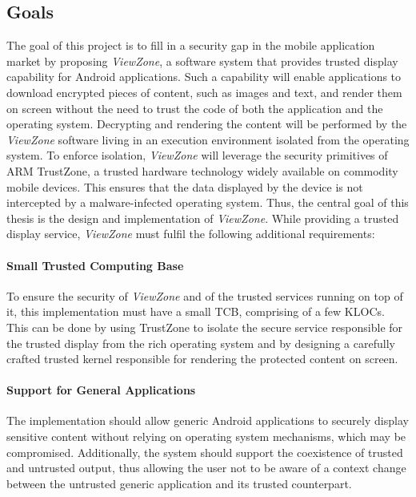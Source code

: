\subsection{Goals}
The goal of this project is to fill in a security gap in the mobile application market by proposing \emph{ViewZone}, a software system that provides trusted display capability for Android applications. Such a capability will enable applications to download encrypted pieces of content, such as images and text, and render them on screen without the need to trust the code of both the application and the operating system. Decrypting and rendering the content will be performed by the \emph{ViewZone} software living in an execution environment isolated from the operating system. To enforce isolation, \emph{ViewZone} will leverage the security primitives of ARM TrustZone, a trusted hardware technology widely available on commodity mobile devices. This ensures that the data displayed by the device is not intercepted by a malware-infected operating system. Thus, the central goal of this thesis is the design and implementation of \emph{ViewZone}. While providing a trusted display service, \emph{ViewZone} must fulfil the following additional requirements:

\paragraph*{\textbf{Small Trusted Computing Base\\}} To ensure the security of \emph{ViewZone} and of the trusted services running on top of it, this implementation must have a small \ac{TCB}, comprising of a few KLOCs. This can be done by using TrustZone to isolate the secure service responsible for the trusted display from the rich operating system and by designing a carefully crafted trusted kernel responsible for rendering the protected content on screen.

\paragraph*{\textbf{Support for General Applications\\}} The implementation should allow generic Android applications to securely display sensitive content without relying on operating system mechanisms, which may be compromised. Additionally, the system should support the coexistence of trusted and untrusted output, thus allowing the user not to be aware of a context change between the untrusted generic application and its trusted counterpart.


